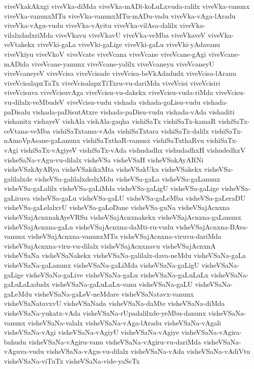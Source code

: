 {viveVkakAkxgi
viveVka-diMda
viveVka-mADi-koLuLxvuda-ralilx
viveVka-vanunx
viveVka-vanunxMTu
viveVka-vanunxMTu-mADu-vadu
viveVka-vAga-lAradu
viveVka-vAgu-vudu
viveVka-vAyitu
viveVka-vilAsa-dalilx
viveVka-vilalxdadxriMda
viveVkavu
viveVkavU
viveVka-veMba
viveVkaveV
viveVka-veVtakekx
viveVki-gaLa
viveVki-gaLige
viveVki-gaLu
viveVki-yAdavanu
viveVkiyu
viveVkoV
viveVcate
viveVcana
viveVcane
viveVcane-gAgi
viveVcane-mADida
viveVcane-yanunx
viveVcane-yalilx
viveVcaneyu
viveVcaneyU
viveVcaneyeV
viveVcisa
viveVcisade
viveVcisa-beVkAdadudx
viveVcisa-lAranu
viveVcisalapxTaTx
viveVcisalapxTiTxru-vu-dariMda
viveVcisi
viveVcisiri
viveVcisuva
viveVcisuvAga
viveVcisu-vu-dakekx
viveVcisu-vuda-riMda
viveVcisu-vu-dilalx-veMbudeV
viveVcisu-vudu
vishada
vishada-goLisu-vudu
vishada-paDisalu
vishada-paDisutAtxre
vishada-paDisu-vudu
vishada-vAda
vishaditi
vishanitx
vishayeV
vishAla
vishAla-gaqha
vishiSaTx
vishiSaTx-kamaR
vishiSaTx-ceVtana-veMba
vishiSaTxtama-vAda
vishiSaTxtara
vishiSaTx-dalilx
vishiSaTx-nAmoVpAsane-gaLanunx
vishiSaTxthaR-vanunx
vishiSaTxthaRvu
vishiSaTx-vAgi
vishiSaTx-vAgiyeV
vishiSaTx-vAda
vishudadhx
vishudadhxH
vishudedhxV
visheSaNa-vAgu-vu-dilalx
visheVSa
visheVSaH
visheVSakAyARNi
visheVSakAyARya
visheVSakikxMta
visheVSakUkx
visheVSakekx
visheVSa-galilalxde
visheVSa-galilalxdedxMdu
visheVSa-gaLa
visheVSa-gaLanunx
visheVSa-gaLalilx
visheVSa-gaLiMda
visheVSa-gaLigU
visheVSa-gaLige
visheVSa-gaLiruva
visheVSa-gaLu
visheVSa-gaLU
visheVSa-gaLeMba
visheVSa-gaLeraDU
visheVSa-gaLelalxvU
visheVSa-gaLoDane
visheVSa-guNa
visheVSajAcnxna
visheVSajAcnxnakAyeVRSu
visheVSajAcnxnakekx
visheVSajAcnxna-gaLanunx
visheVSajAcnxna-gaLu
visheVSajAcnxna-daMti-ru-vudu
visheVSajAcnxna-BAva-vanunx
visheVSajAcnxna-vanunxMTu
visheVSajAcnxna-viruvu-dariMda
visheVSajAcnxna-viru-vu-dilalx
visheVSajAcnxnavu
visheVSajAcnxnA
visheVSaNa
visheVSaNakekx
visheVSaNa-galilalx-dava-neMdu
visheVSaNa-gaLa
visheVSaNa-gaLanunx
visheVSaNa-gaLiMda
visheVSaNa-gaLigU
visheVSaNa-gaLige
visheVSaNa-gaLive
visheVSaNa-gaLu
visheVSaNa-gaLuLaLx
visheVSaNa-gaLuLaLxdudx
visheVSaNa-gaLuLaLx-vanu
visheVSaNa-gaLU
visheVSaNa-gaLeMdu
visheVSaNa-gaLeV-neMdare
visheVSaNatavx-vanunx
visheVSaNatavxvU
visheVSaNada
visheVSaNa-daMte
visheVSaNa-diMda
visheVSaNa-yukatx-vAda
visheVSaNa-rUpadalilxde-yeMbu-danunx
visheVSaNa-vanunx
visheVSaNa-valalx
visheVSaNa-vAga-lAradu
visheVSaNa-vAgali
visheVSaNa-vAgi
visheVSaNa-vAgiyU
visheVSaNa-vAgiye
visheVSaNa-vAgira-bahudu
visheVSaNa-vAgiru-vanu
visheVSaNa-vAgiru-vu-dariMda
visheVSaNa-vAguva-vudu
visheVSaNa-vAgu-vu-dilalx
visheVSaNa-vAda
visheVSaNa-vAdiVtu
visheVSaNa-viTuTx
visheVSaNa-vide-yaSeTx
}
